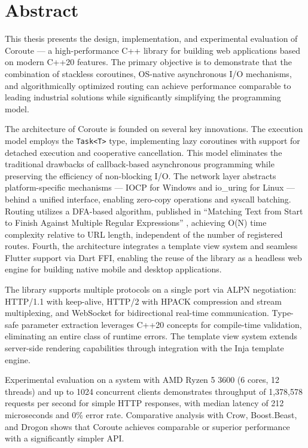 \section*{Abstract}

This thesis presents the design, implementation, and experimental evaluation of Coroute --- a high-performance C++ library for building web applications based on modern C++20 features. The primary objective is to demonstrate that the combination of stackless coroutines, OS-native asynchronous I/O mechanisms, and algorithmically optimized routing can achieve performance comparable to leading industrial solutions while significantly simplifying the programming model.

The architecture of Coroute is founded on several key innovations. The execution model employs the \texttt{Task<T>} type, implementing lazy coroutines with support for detached execution and cooperative cancellation. This model eliminates the traditional drawbacks of callback-based asynchronous programming while preserving the efficiency of non-blocking I/O. The network layer abstracts platform-specific mechanisms --- IOCP for Windows and io\_uring for Linux --- behind a unified interface, enabling zero-copy operations and syscall batching. Routing utilizes a DFA-based algorithm, published in ``Matching Text from Start to Finish Against Multiple Regular Expressions'' \cite{stankov2024regex}, achieving O(N) time complexity relative to URL length, independent of the number of registered routes. Fourth, the architecture integrates a template view system and seamless Flutter support via Dart FFI, enabling the reuse of the library as a headless web engine for building native mobile and desktop applications.

The library supports multiple protocols on a single port via ALPN negotiation: HTTP/1.1 with keep-alive, HTTP/2 with HPACK compression and stream multiplexing, and WebSocket for bidirectional real-time communication. Type-safe parameter extraction leverages C++20 concepts for compile-time validation, eliminating an entire class of runtime errors. The template view system extends server-side rendering capabilities through integration with the Inja template engine.

Experimental evaluation on a system with AMD Ryzen 5 3600 (6 cores, 12 threads) and up to 1024 concurrent clients demonstrates throughput of 1,378,578 requests per second for simple HTTP responses, with median latency of 212 microseconds and 0\% error rate. Comparative analysis with Crow, Boost.Beast, and Drogon shows that Coroute achieves comparable or superior performance with a significantly simpler API.

